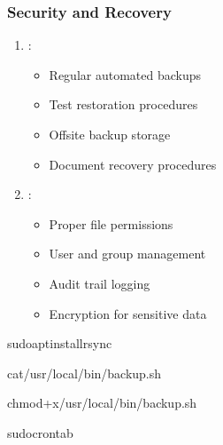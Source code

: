 \documentclass[letterpaper,10pt,english]{sphinxmanual}
\begin{document}
\subsubsection{Security and Recovery}
\label{\detokenize{disk-management:security-and-recovery}}\begin{enumerate}
%
\item {} 
\sphinxAtStartPar
{}:
\begin{itemize}
\item {} 
\sphinxAtStartPar
Regular automated backups

\item {} 
\sphinxAtStartPar
Test restoration procedures

\item {} 
\sphinxAtStartPar
Offsite backup storage

\item {} 
\sphinxAtStartPar
Document recovery procedures

\end{itemize}

\item {} 
\sphinxAtStartPar
{}:
\begin{itemize}
\item {} 
\sphinxAtStartPar
Proper file permissions

\item {} 
\sphinxAtStartPar
User and group management

\item {} 
\sphinxAtStartPar
Audit trail logging

\item {} 
\sphinxAtStartPar
Encryption for sensitive data

\end{itemize}

\end{enumerate}

\begin{sphinxVerbatim}[commandchars=\\\{\}]
sudoaptinstallrsync

cat\PYGZgt{}/usr/local/bin/backup.sh

chmod+x/usr/local/bin/backup.sh

sudocrontab\PYGZhy{}
\end{sphinxVerbatim}
\end{document}
